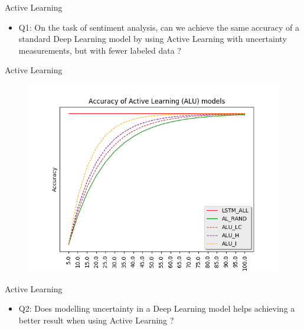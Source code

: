 \documentclass[10pt]{beamer}
\begin{document}
\begin{frame}[fragile]{Active Learning}
    \begin{itemize}
        \item \alert{Q1}: On the task of sentiment analysis, can we achieve the same
            accuracy of a standard Deep Learning model by using Active Learning
            with uncertainty measurements, but with fewer labeled data ?
    \end{itemize}
\end{frame}

\begin{frame}[fragile]{Active Learning}
    \begin{figure}[htp]
        \centering
        \includegraphics[scale=0.6]{images/active_learning_comp_graph.png}
    \end{figure}
\end{frame}

\begin{frame}[fragile]{Active Learning}
    \begin{itemize}
        \item \alert{Q2}: Does modelling uncertainty in a Deep Learning model helps
            achieving a better result when using Active Learning ?
    \end{itemize}
\end{frame}
\end{document}
